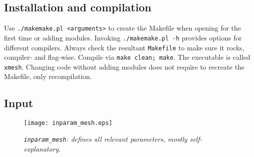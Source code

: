 \documentclass[11pt,letter,fleqn,english,notitlepage]{article}
\begin{document}
\subsection{Installation and compilation}
Use {\tt ./makemake.pl <arguments>} to create the Makefile when opening for the first time or adding modules. 
Invoking {\tt ./makemake.pl -h} provides options for different compilers. Always check the resultant {\tt Makefile} to make 
sure it rocks, compiler- and flag-wise. Compile via {\tt make clean; make}. The executable is called {\tt xmesh}. 
Changing code without adding modules does not require to recreate the Makefile, only recompilation.

\subsection{Input}
\begin{figure*}[htb]
\begin{center}
\texttt{[image: inparam\_mesh.eps]}
\caption{\textit{{\tt inparam\_mesh}: defines all relevant parameters, mostly self-explanatory. }}
\end{center}
\end{figure*}
\end{document}
